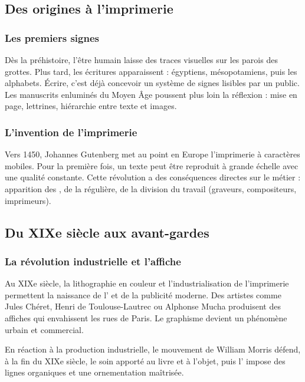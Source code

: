 \subsection{Des origines à l'imprimerie}

\subsubsection{Les premiers signes}

Dès la préhistoire, l'être humain laisse des traces visuelles sur les parois des grottes. Plus tard, les écritures apparaissent :  égyptiens,  mésopotamiens, puis les alphabets. Écrire, c'est déjà concevoir un système de signes lisibles par un public. Les manuscrits enluminés du Moyen Âge poussent plus loin la réflexion : mise en page, lettrines, hiérarchie entre texte et images.

\subsubsection{L'invention de l'imprimerie}

Vers 1450, Johannes Gutenberg met au point en Europe l'imprimerie à caractères mobiles. Pour la première fois, un texte peut être reproduit à grande échelle avec une qualité constante. Cette révolution a des conséquences directes sur le métier : apparition des , de la  régulière, de la division du travail (graveurs, compositeurs, imprimeurs).

\subsection{Du XIXe siècle aux avant-gardes}

\subsubsection{La révolution industrielle et l'affiche}

Au XIXe siècle, la lithographie en couleur et l'industrialisation de l'imprimerie permettent la naissance de l' et de la publicité moderne. Des artistes comme Jules Chéret, Henri de Toulouse-Lautrec ou Alphonse Mucha produisent des affiches qui envahissent les rues de Paris. Le graphisme devient un phénomène urbain et commercial.

En réaction à la production industrielle, le mouvement  de William Morris défend, à la fin du XIXe siècle, le soin apporté au livre et à l'objet, puis l' impose des lignes organiques et une ornementation maîtrisée.

